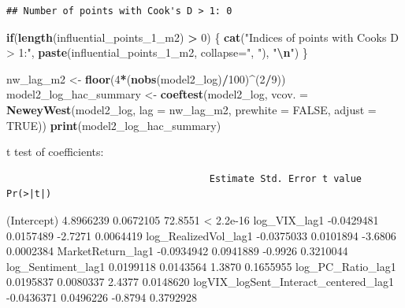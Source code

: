 \documentclass[
]{article}
\newenvironment{Shaded}{\begin{snugshade}}{\end{snugshade}}
\newcommand{\AttributeTok}[1]{\textcolor[rgb]{0.13,0.29,0.53}{#1}}
\newcommand{\ConstantTok}[1]{\textcolor[rgb]{0.56,0.35,0.01}{#1}}
\newcommand{\ControlFlowTok}[1]{\textcolor[rgb]{0.13,0.29,0.53}{\textbf{#1}}}
\newcommand{\DecValTok}[1]{\textcolor[rgb]{0.00,0.00,0.81}{#1}}
\newcommand{\FunctionTok}[1]{\textcolor[rgb]{0.13,0.29,0.53}{\textbf{#1}}}
\newcommand{\NormalTok}[1]{#1}
\newcommand{\OtherTok}[1]{\textcolor[rgb]{0.56,0.35,0.01}{#1}}
\newcommand{\SpecialCharTok}[1]{\textcolor[rgb]{0.81,0.36,0.00}{\textbf{#1}}}
\newcommand{\StringTok}[1]{\textcolor[rgb]{0.31,0.60,0.02}{#1}}
\begin{document}
\begin{verbatim}
## Number of points with Cook's D > 1: 0
\end{verbatim}

\begin{Shaded}
\begin{Highlighting}[]
    \ControlFlowTok{if}\NormalTok{(}\FunctionTok{length}\NormalTok{(influential\_points\_1\_m2) }\SpecialCharTok{\textgreater{}} \DecValTok{0}\NormalTok{) \{}
        \FunctionTok{cat}\NormalTok{(}\StringTok{"Indices of points with Cook\textquotesingle{}s D \textgreater{} 1:"}\NormalTok{, }\FunctionTok{paste}\NormalTok{(influential\_points\_1\_m2, }\AttributeTok{collapse=}\StringTok{", "}\NormalTok{), }\StringTok{"}\SpecialCharTok{\textbackslash{}n}\StringTok{"}\NormalTok{)}
\NormalTok{    \}}
\end{Highlighting}
\end{Shaded}

\begin{Shaded}
\begin{Highlighting}[]
\NormalTok{  nw\_lag\_m2 }\OtherTok{\textless{}{-}} \FunctionTok{floor}\NormalTok{(}\DecValTok{4}\SpecialCharTok{*}\NormalTok{(}\FunctionTok{nobs}\NormalTok{(model2\_log)}\SpecialCharTok{/}\DecValTok{100}\NormalTok{)}\SpecialCharTok{\^{}}\NormalTok{(}\DecValTok{2}\SpecialCharTok{/}\DecValTok{9}\NormalTok{)) }
\NormalTok{  model2\_log\_hac\_summary }\OtherTok{\textless{}{-}} \FunctionTok{coeftest}\NormalTok{(model2\_log, }\AttributeTok{vcov. =} \FunctionTok{NeweyWest}\NormalTok{(model2\_log, }\AttributeTok{lag =}\NormalTok{ nw\_lag\_m2, }\AttributeTok{prewhite =} \ConstantTok{FALSE}\NormalTok{, }\AttributeTok{adjust =} \ConstantTok{TRUE}\NormalTok{))}
  \FunctionTok{print}\NormalTok{(model2\_log\_hac\_summary)}
\end{Highlighting}
\end{Shaded}

t test of coefficients:

\begin{verbatim}
                                    Estimate Std. Error t value  Pr(>|t|)
\end{verbatim}

(Intercept) 4.8966239 0.0672105 72.8551 \textless{} 2.2e-16
log\_VIX\_lag1 -0.0429481 0.0157489 -2.7271 0.0064419
log\_RealizedVol\_lag1 -0.0375033 0.0101894 -3.6806 0.0002384
MarketReturn\_lag1 -0.0934942 0.0941889 -0.9926 0.3210044
log\_Sentiment\_lag1 0.0199118 0.0143564 1.3870 0.1655955
log\_PC\_Ratio\_lag1 0.0195837 0.0080337 2.4377 0.0148620
logVIX\_logSent\_Interact\_centered\_lag1 -0.0436371 0.0496226 -0.8794
0.3792928
\end{document}
